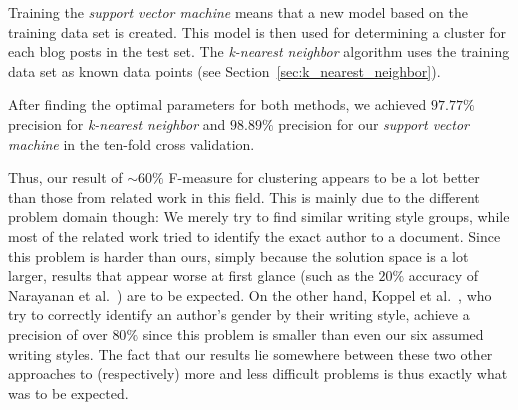Training the \textit{support vector machine} means that a new model based on the training data set is created.
This model is then used for determining a cluster for each blog posts in the test set.
The \textit{k-nearest neighbor} algorithm uses the training data set as known data points (see Section~\ref{sec:k_nearest_neighbor}).


After finding the optimal parameters for both methods, we achieved $97.77\%$ precision for \textit{k-nearest neighbor} and $98.89\%$ precision for our \textit{support vector machine} in the ten-fold cross validation.


Thus, our result of $\sim60\%$ F-measure for clustering appears to be a lot better than those from related work in this field.
This is mainly due to the different problem domain though:
We merely try to find similar writing style groups, while most of the related work tried to identify the exact author to a document.
Since this problem is harder than ours, simply because the solution space is a lot larger, results that appear worse at first glance (such as the $20\%$ accuracy of Narayanan et al.~\cite{narayanan2012feasibility}) are to be expected.
On the other hand, Koppel et al.~\cite{koppel2003automatically}, who try to correctly identify an author's gender by their writing style, achieve a precision of over $80\%$ since this problem is smaller than even our six assumed writing styles.
The fact that our results lie somewhere between these two other approaches to (respectively) more and less difficult problems is thus exactly what was to be expected.